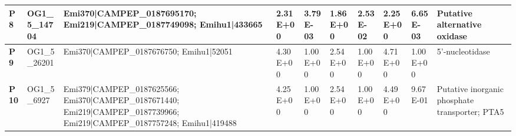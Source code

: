 \begin{landscape}
\begin{center}
\begin{footnotesize}
\begin{longtable}{|p{0.5cm}|p{1.5cm}|p{4cm}|l|l|l|l|l|l|l|}
\textbf{P8}  & OG1\_5\_14704 & Emi370|CAMPEP\_0187695170; Emi219|CAMPEP\_0187749098; Emihu1|433665                                                                                                                                                                                                                                                                                                                                                                                                                                                                                                                                                                      & 2.31E+00  & 3.79E-03 & 1.86E+00  & 2.53E-02 & 2.25E+00  & 6.65E-03 & Putative alternative oxidase                                                 \\ \hline
\textbf{P9}  & OG1\_5\_26201 & Emi370|CAMPEP\_0187676750; Emihu1|52051                                                                                                                                                                                                                                                                                                                                                                                                                                                                                                                                                                                                  & 4.30E+00  & 1.00E+00 & 2.54E+00  & 1.00E+00 & 4.71E+00  & 1.00E+00 & 5'-nucleotidase                                                              \\ \hline
\textbf{P10} & OG1\_5\_6927  & Emi379|CAMPEP\_0187625566; Emi370|CAMPEP\_0187671440; Emi219|CAMPEP\_0187739966; Emi219|CAMPEP\_0187757248; Emihu1|419488                                                                                                                                                                                                                                                                                                                                                                                                                                                                                                                & 4.25E+00  & 1.00E+00 & 2.54E+00  & 1.00E+00 & 4.49E+00  & 9.67E-01 & Putative inorganic phosphate transporter; PTA5                               \\ \hline

\end{longtable}
\end{footnotesize}
\end{center}
\end{landscape}

